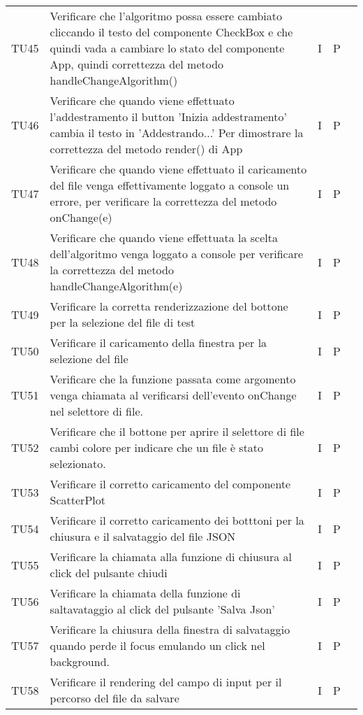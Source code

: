 \begin{longtable} {
		>{}p{15mm} 
		>{}p{79.5mm}
		>{}p{15mm} 
		>{}p{15mm}
		>{}p{0mm}}
	TU45	& Verificare che l'algoritmo possa essere cambiato cliccando il testo del componente CheckBox e che quindi vada a cambiare lo stato del componente App, quindi correttezza del metodo handleChangeAlgorithm() & I & P &\TBstrut \\ [2mm]
	TU46	& Verificare che quando viene effettuato l'addestramento il button 'Inizia addestramento' cambia il testo in 'Addestrando...' Per dimostrare la correttezza del metodo render() di App & I & P &\TBstrut \\ [2mm]
	TU47	& Verificare che quando viene effettuato il caricamento del file venga effettivamente loggato a console un errore, per verificare la correttezza del metodo onChange(e) & I & P &\TBstrut \\ [2mm]
	TU48	& Verificare che quando viene effettuata la scelta dell'algoritmo venga loggato a console per verificare la correttezza del metodo handleChangeAlgorithm(e) & I & P &\TBstrut \\ [2mm]
	TU49	& Verificare la corretta renderizzazione del bottone per la selezione del file di test & I & P &\TBstrut \\ [2mm]
	TU50	& Verificare il caricamento della finestra per la selezione del file & I & P &\TBstrut \\ [2mm]
	TU51	& Verificare che la funzione passata come argomento venga chiamata al verificarsi dell'evento onChange nel selettore di file. & I & P &\TBstrut \\ [2mm]
	TU52	& Verificare che il bottone per aprire il selettore di file cambi colore per indicare che un file è stato selezionato. & I & P &\TBstrut \\ [2mm]
	TU53	& Verificare il corretto caricamento del componente ScatterPlot & I & P &\TBstrut \\ [2mm]
	TU54	& Verificare il corretto caricamento dei botttoni per la chiusura e il salvataggio del file JSON & I & P &\TBstrut \\ [2mm]
	TU55	& Verificare la chiamata alla funzione di chiusura al click del pulsante chiudi & I & P &\TBstrut \\ [2mm]
	TU56	& Verificare la chiamata della funzione di saltavataggio al click del pulsante 'Salva Json' & I & P &\TBstrut \\ [2mm]
	TU57	& Verificare la chiusura della finestra di salvataggio quando perde il focus emulando un click nel background. & I & P &\TBstrut \\ [2mm]
	TU58	& Verificare il rendering del campo di input per il percorso del file da salvare & I & P &\TBstrut \\ [2mm]

\end{longtable}
